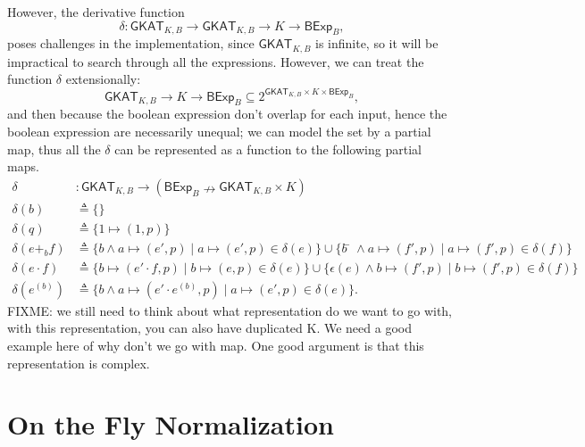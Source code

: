 \documentclass[acmsmall,screen]{acmart}
\newcommand{\theoryOf}[1]{\ensuremath{\mathsf{#1}}}
\newcommand{\GKAT}{\theoryOf{GKAT}}
\newcommand{\BExp}{\theoryOf{BExp}}
\begin{document}
However, the derivative function \[δ: \GKAT_{K, B} → \GKAT_{K, B} → K → \BExp_B,\] poses challenges in the implementation, since \(\GKAT_{K, B}\) is infinite, so it will be impractical to search through all the expressions.
However, we can treat the function \(δ\) extensionally: \[\GKAT_{K, B} → K → \BExp_B ⊆ 2^{\GKAT_{K, B} × K × \BExp_B},\]
and then because the boolean expression don't overlap for each input, hence the boolean expression are necessarily unequal; 
we can model the set by a partial map, thus all the \(δ\) can be represented as a function to the following partial maps.
\begin{align*}
    δ & : \GKAT_{K, B} → (\BExp_B ↛ \GKAT_{K, B} × K) \\
    δ(b) & ≜ \{\} \\
    δ(q) & ≜ \{1 ↦ (1, p)\}\\  
    δ(e +_b f) & ≜ \{b ∧ a ↦ (e', p) ∣ a ↦ (e', p) ∈ δ(e)\} 
        ∪ \{b̄ ∧ a ↦ (f', p) ∣ a ↦ (f', p) ∈ δ(f)\}\\
    δ(e ⋅ f) & ≜ \{b ↦ (e' ⋅ f, p) ∣ b ↦ (e, p) ∈ δ(e)\}
        ∪ \{ϵ(e) ∧ b ↦ (f', p) ∣ b ↦ (f', p) ∈ δ(f)\}\\
    δ(e^{(b)}) & ≜ \{b ∧ a ↦ (e' ⋅ e^{(b)}, p) ∣ a ↦ (e', p) ∈ δ(e)\}.
\end{align*}
FIXME: we still need to think about what representation do we want to go with, with this representation, you can also have duplicated K. We need a good example here of why don't we go with map. One good argument is that this representation is complex.

\section{On the Fly Normalization}
\end{document}
